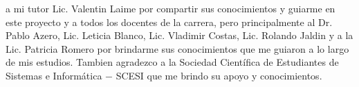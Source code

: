 
 a mi tutor Lic. Valentin Laime por compartir sus conocimientos
y guiarme en este proyecto y a todos los docentes de la carrera, pero principalmente
al Dr. Pablo Azero, Lic. Leticia Blanco, Lic. Vladimir Costas, Lic. Rolando Jaldin
y a la Lic. Patricia Romero por brindarme sus conocimientos que me guiaron a lo
largo de mis estudios. Tambien agradezco a la Sociedad Cient\'ifica de Estudiantes
de Sistemas e Inform\'atica $-$ SCESI que me brindo su apoyo y conocimientos.

